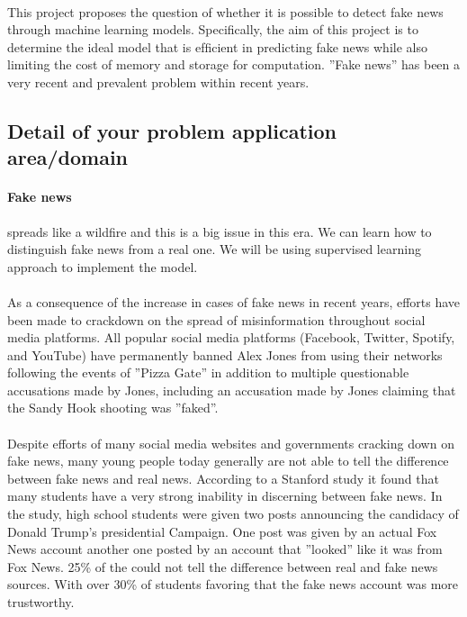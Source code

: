 \documentclass[11.5pt]{article}
\begin{document}
\begin{multicols}{2}
\paragraph{}
This project proposes the question of whether it is possible to detect fake news through machine learning models. Speciﬁcally, the aim of this project is to determine the ideal model that is efﬁcient in predicting fake news while also limiting the cost of memory and storage for computation. ”Fake news” has been a very recent and prevalent problem within recent years.

\subsection{Detail of your problem application area/domain}
\paragraph{Fake news}
spreads like a wildfire and this is a big issue in this era. We can learn how to distinguish fake news from a real one. We will be using supervised learning approach to implement the model.

\paragraph{}
As a consequence of the increase in cases of fake news in recent years, efforts have been made to crackdown on the spread of misinformation throughout social media platforms. All popular social media platforms (Facebook, Twitter, Spotify, and YouTube) have permanently banned Alex Jones from using their networks \citep{alexjones2018banned} following the events of ”Pizza Gate” \citep{pizzagate} in addition to multiple questionable accusations made by Jones, including an accusation made by Jones claiming that the Sandy Hook shooting was ”faked”.

\paragraph{}
Despite efforts of many social media websites and governments cracking down on fake news, many young people today generally are not able to tell the difference between fake news and real news. According to a Stanford study it found that many students have a very strong inability in discerning between fake news. In the study, high school students were given two posts announcing the candidacy of Donald Trump’s presidential Campaign. One post was given by an actual Fox News account another one posted by an account that ”looked” like it was from Fox News. 25\% of the could not tell the difference between real and fake news sources. With over 30\% of students favoring that the fake news account was more trustworthy.


\end{multicols}
\end{document}
